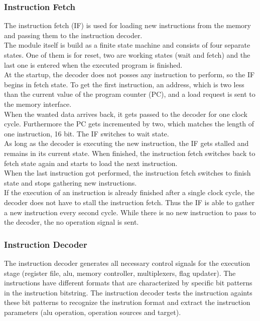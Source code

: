 \subsubsection{Instruction Fetch}
\label{subsubsec:instructionfetch}
The instruction fetch (IF) is used for loading new instructions from the memory and passing them to the instruction decoder.\\
The module itself is build as a finite state machine and consists of four separate states. One of them is for reset, two are working states (wait and fetch) and the last one is entered when the executed program is finished.\\
\newline
At the startup, the decoder does not posses any instruction to perform, so the IF begins in fetch state. To get the first instruction, an address, which is two less than the current value of the program counter (PC), and a load request is sent to the memory interface.\\
When the wanted data arrives back, it gets passed to the decoder for one clock cycle. Furthermore the PC gets incremented by two, which matches the length of one instruction, 16 bit. The IF switches to wait state.\\
As long as the decoder is executing the new instruction, the IF gets stalled and remains in its current state. When finished, the instruction fetch switches back to fetch state again and starts to load the next instruction.\\
When the last instruction got performed, the instruction fetch switches to finish state and stops gathering new instructions.\\
\newline
If the execution of an instruction is already finished after a single clock cycle, the decoder does not have to stall the instruction fetch. Thus the IF is able to gather a new instruction every second cycle. While there is no new instruction to pass to the decoder, the no operation signal is sent.

\subsubsection{Instruction Decoder}
\label{subsubsec:instructiondecoder}
The instruction decoder generates all necessary control signals for the execution stage (register file, alu, memory controller, multiplexers, flag updater). The instructions have different formats that are characterized by specific bit patterns in the instruction bitstring. The instruction decoder tests the instruction againts these bit patterns to recognize the instrution format and extract the instruction parameters (alu operation, operation sources and target).

